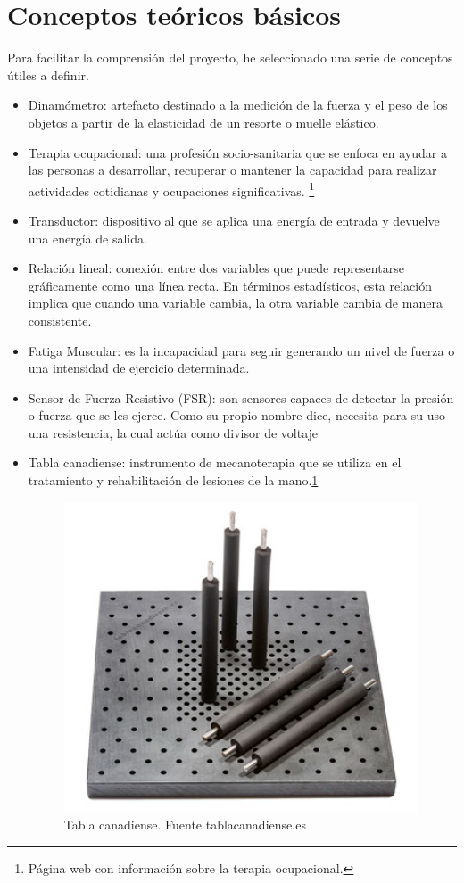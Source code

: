 \section{Conceptos teóricos básicos}
Para facilitar la comprensión del proyecto, he seleccionado una serie de conceptos útiles a definir. 
\begin{itemize}
    \item Dinamómetro: artefacto destinado a la medición de la fuerza y el peso de los objetos a partir de la elasticidad de un resorte o muelle elástico.\cite{Dinamometro}
    \item Terapia ocupacional: una profesión socio-sanitaria que se enfoca en ayudar a las personas a desarrollar, recuperar o mantener la capacidad para realizar actividades cotidianas y ocupaciones significativas. \cite{T.O}\footnote{Página web con información sobre la terapia ocupacional\cite{T.O}.}
    \item Transductor: dispositivo al que se aplica una energía de entrada y devuelve una energía de salida.\cite{celulas_extensométricas}
    \item Relación lineal: conexión entre dos variables que puede representarse gráficamente como una línea recta. En términos estadísticos, esta relación implica que cuando una variable cambia, la otra variable cambia de manera consistente.\cite{LEARN_STATISTICS_EASILY}
    \item Fatiga Muscular: es la incapacidad para seguir generando un nivel de fuerza o una intensidad de ejercicio determinada. \cite{gomez_campos_mecanismos_2010}
    \item Sensor de Fuerza Resistivo (FSR): son sensores capaces de detectar la presión o fuerza que se les ejerce. Como su propio nombre dice, necesita para su uso una resistencia, la cual actúa como divisor de voltaje
    \item Tabla canadiense: instrumento de mecanoterapia que se utiliza en el tratamiento y rehabilitación de lesiones de la mano.\ref{fig:tabla canadiense}\cite{cantero_tellez_terapia_2020}
    \begin{figure}
        \centering
        \includegraphics[width=0.5\linewidth]{img/Tabla_Canadiense.png}
        \caption{Tabla canadiense. Fuente tablacanadiense.es}
        \label{fig:tabla canadiense}
    \end{figure}


\end{itemize}
